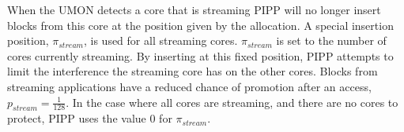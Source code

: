 When the UMON detects a core that is streaming PIPP will no longer insert blocks from this core at the position given by the allocation.
A special insertion position, $\pi_{stream}$, is used for all streaming cores.
$\pi_{stream}$ is set to the number of cores currently streaming. 
By inserting at this fixed position, PIPP attempts to limit the interference the streaming core has on the other cores.
Blocks from streaming applications have a reduced chance of promotion after an access, $p_{stream} = \frac{1}{128}$.
In the case where all cores are streaming, and there are no cores to protect, PIPP uses the value 0 for $\pi_{stream}$.


